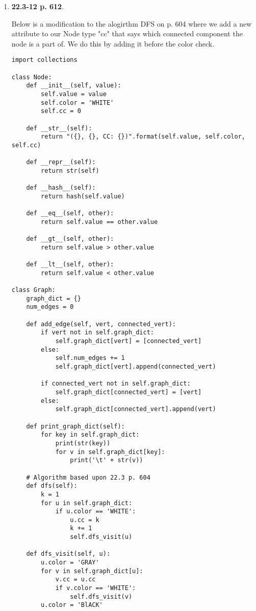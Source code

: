 \documentclass{article}
\begin{document}
\begin{enumerate}
    \item \textbf{22.3-12 p. 612}.
    
    Below is a modification to the alogirthm DFS on p. 604 where we add a new attribute to our Node type "cc" that says which connected component the node is a part of. 
    We do this by adding it before the color check.

    \begin{lstlisting}
import collections      

class Node:
    def __init__(self, value):
        self.value = value
        self.color = 'WHITE'
        self.cc = 0
      
    def __str__(self):
        return "({}, {}, CC: {})".format(self.value, self.color, self.cc)
    
    def __repr__(self):
        return str(self)
    
    def __hash__(self):
        return hash(self.value)
        
    def __eq__(self, other):
        return self.value == other.value

    def __gt__(self, other):
        return self.value > other.value
    
    def __lt__(self, other):
        return self.value < other.value

class Graph:    
    graph_dict = {}
    num_edges = 0

    def add_edge(self, vert, connected_vert):  
        if vert not in self.graph_dict:
            self.graph_dict[vert] = [connected_vert]
        else:
            self.num_edges += 1
            self.graph_dict[vert].append(connected_vert)
            
        if connected_vert not in self.graph_dict:
            self.graph_dict[connected_vert] = [vert]
        else:
            self.graph_dict[connected_vert].append(vert)

    def print_graph_dict(self):
        for key in self.graph_dict:
            print(str(key))
            for v in self.graph_dict[key]:
                print('\t' + str(v))
    
    # Algorithm based upon 22.3 p. 604
    def dfs(self):
        k = 1
        for u in self.graph_dict:
            if u.color == 'WHITE':
                u.cc = k
                k += 1
                self.dfs_visit(u)
                
    def dfs_visit(self, u):
        u.color = 'GRAY'
        for v in self.graph_dict[u]:
            v.cc = u.cc
            if v.color == 'WHITE':
                self.dfs_visit(v)
        u.color = 'BlACK'      
    \end{lstlisting}


\end{enumerate}
\end{document}
